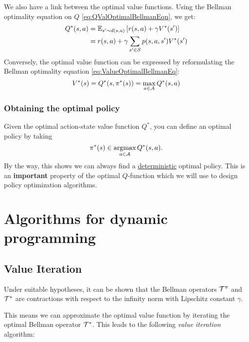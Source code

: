 \documentclass[../course-notes.tex]{subfiles}
\begin{document}
We also have a link between the optimal value functions. Using the Bellman optimality equation on $Q$ \eqref{eq:QValOptimalBellmanEqn}, we get:
\begin{equation}
\begin{aligned}
	Q^*(s,a) &= \operatorname{\mathbb{E}}_{s'\sim d(s,a)}\left[
	r(s,a) + \gamma V^*(s') \right]  \\
	&=
	r(s,a) + \gamma \sum_{s'\in\mathcal{S}} p(s,a,s') V^*(s')
\end{aligned}
\end{equation}
Conversely, the optimal value function can be expressed by reformulating the Bellman optimality equation \eqref{eq:ValueOptimalBellmanEq}:
\begin{equation}
	V^*(s) = Q^*(s,\pi^*(s)) =
	\max_{a\in\mathcal{A}} Q^*(s,a)
\end{equation}


\subsubsection{Obtaining the optimal policy}

Given the optimal action-state value function $Q^*$, you can define an optimal policy by taking
\begin{equation}\label{eq:QValueToOptimalPolicy}
	\pi^*(s) \in \operatorname*{\mathrm{argmax}}_{a\in\mathcal{A}} Q^*(s,a).
\end{equation}
By the way, this shows we can always find a \underline{deterministic} optimal policy. This is an \textbf{important} property of the optimal $Q$-function which we will use to design policy optimization algorithms.


\section{Algorithms for dynamic programming}



\subsection{Value Iteration}

Under suitable hypotheses, it can be shown that the Bellman operators $\mathcal{T}^\pi$ and $\mathcal{T}^*$ are contractions with respect to the infinity norm with Lipschitz constant $\gamma$.

This means we can approximate the optimal value function by iterating the optimal Bellman operator $\mathcal{T}^*$. This leads to the following \textit{value iteration} algorithm:
\end{document}
